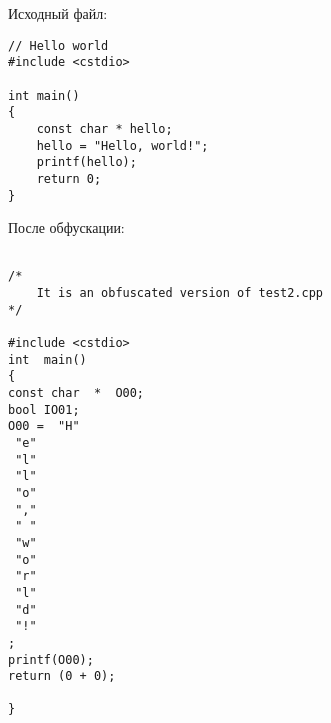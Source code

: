 \documentclass[a4paper]{article}
\begin{document}
Исходный файл:

\begin{verbatim}
// Hello world
#include <cstdio>

int main()
{
    const char * hello;
    hello = "Hello, world!";
    printf(hello);
    return 0;
}
\end{verbatim}

После обфускации:

\begin{verbatim}

/*
	It is an obfuscated version of test2.cpp
*/

#include <cstdio>
int  main()
{
const char  *  O00;
bool IO01;
O00 =  "H"
 "e"
 "l"
 "l"
 "o"
 ","
 " "
 "w"
 "o"
 "r"
 "l"
 "d"
 "!"
;
printf(O00);
return (0 + 0);

}

\end{verbatim}
\end{document}
